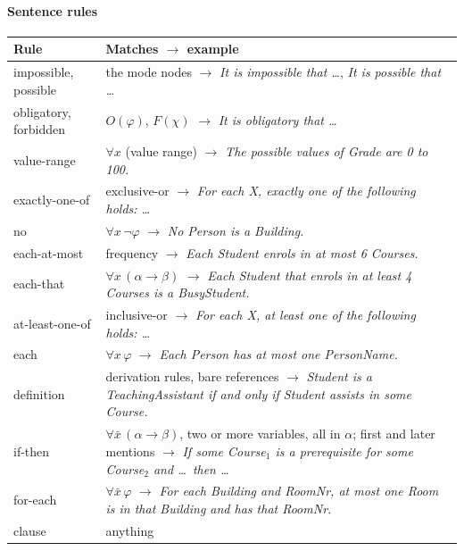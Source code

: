 \documentclass[11pt, a4paper]{article}
\begin{document}
\paragraph{Sentence rules}
\begin{center}
\small
\begin{tabularx}{\textwidth}{>{\raggedright\arraybackslash\leavevmode\ttfamily\color{codefg}}p{} X}
\toprule
\normalfont\textbf{Rule} & \textbf{Matches $\to$ example} \\
\midrule
impossible, possible & the mode nodes $\to$ \textit{It is impossible that \ldots}, \textit{It is possible that \ldots} \\
obligatory, forbidden & $O(\varphi)$, $F(\chi)$ $\to$ \textit{It is obligatory that \ldots} \\
value-range & $\forall x$ (value range) $\to$ \textit{The possible values of Grade are 0 to 100.} \\
exactly-one-of & exclusive-or $\to$ \textit{For each X, exactly one of the following holds: \ldots} \\
no & $\forall x\,\neg\varphi$ $\to$ \textit{No Person is a Building.} \\
each-at-most & frequency $\to$ \textit{Each Student enrols in at most 6 Courses.} \\
each-that & $\forall x\,(\alpha \to \beta)$ $\to$ \textit{Each Student that enrols in at least 4 Courses is a BusyStudent.} \\
at-least-one-of & inclusive-or $\to$ \textit{For each X, at least one of the following holds: \ldots} \\
each & $\forall x\,\varphi$ $\to$ \textit{Each Person has at most one PersonName.} \\
definition & derivation rules, bare references $\to$ \textit{Student is a TeachingAssistant if and only if Student assists in some Course.} \\
if-then & $\forall\bar x\,(\alpha\to\beta)$, two or more variables, all in $\alpha$; first and later mentions $\to$ \textit{If some Course$_1$ is a prerequisite for some Course$_2$ and \ldots\ then \ldots} \\
for-each & $\forall\bar x\,\varphi$ $\to$ \textit{For each Building and RoomNr, at most one Room is in that Building and has that RoomNr.} \\
clause & anything \\
\bottomrule
\end{tabularx}
\end{center}
\end{document}
